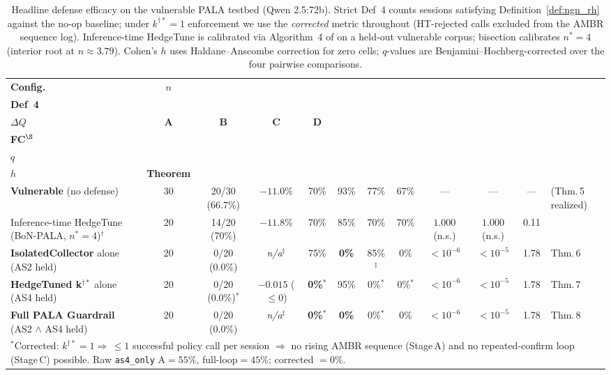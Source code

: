 \begin{table}[!t]
\caption{Headline defense efficacy on the vulnerable PALA testbed
(Qwen 2.5:72b). Strict Def~4 counts sessions satisfying
Definition~\ref{def:ngn_rh} against the no-op baseline; under
$k^{\dagger\!*}\!=\!1$ enforcement we use the \emph{corrected}
metric throughout (HT-rejected calls excluded from the AMBR sequence
log). Inference-time HedgeTune is calibrated via Algorithm~4 of
\cite{ref26} on a held-out vulnerable corpus; bisection calibrates $n^*\!=\!4$
(interior root at $n\approx3.79$). Cohen's $h$ uses
Haldane--Anscombe correction for zero cells; $q$-values are
Benjamini--Hochberg-corrected over the four pairwise comparisons.}
\label{tab:rq4_efficacy}
\centering
\scriptsize
\setlength{\tabcolsep}{3pt}
\renewcommand{\arraystretch}{0.9}
\begin{tabularx}{\textwidth}{p{3.4cm}ccccccccccX}
\toprule
\textbf{Config.} & \textbf{$n$} & \shortstack{\textbf{Strict}\\\textbf{Def~4}} & \shortstack{\textbf{Mean}\\\textbf{$\Delta Q$}} & \textbf{A} & \textbf{B} & \textbf{C} & \textbf{D} & \shortstack{\textbf{$p$ vs}\\\textbf{FC$^\S$}} & \shortstack{\textbf{BH}\\\textbf{$q$}} & \shortstack{\textbf{Cohen}\\\textbf{$h$}} & \textbf{Theorem} \\
\midrule
\textbf{Vulnerable} (no defense) & 30 & 20/30 (66.7\%) & $-11.0\%$ & 70\% & 93\% & 77\% & 67\% & --- & --- & --- & (Thm.\,5 realized) \\
Inference-time HedgeTune (BoN-PALA, $n^{*}\!=\!4$)$^\dagger$ & 20 & 14/20 (70\%) & $-11.8\%$ & 70\% & 85\% & 70\% & 70\% & $1.000$ (n.s.) & $1.000$ (n.s.) & 0.11 & \cite{ref26} \\
\textbf{IsolatedCollector} alone (AS2 held) & 20 & 0/20 (0.0\%) & \emph{n/a}$^\ddagger$ & 75\% & \textbf{0\%} & 85\%$^\ddagger$ & 0\% & $<10^{-6}$ & $<10^{-5}$ & 1.78 & Thm.\,6 \\
\textbf{HedgeTuned k$^{\dagger*}$} alone (AS4 held) & 20 & 0/20 (0.0\%)$^*$ & $-0.015$ ($\le 0$) & \textbf{0\%}$^*$ & 95\% & 0\%$^*$ & 0\%$^*$ & $<10^{-6}$ & $<10^{-5}$ & 1.78 & Thm.\,7 \\
\textbf{Full PALA Guardrail} (AS2 $\wedge$ AS4 held) & 20 & 0/20 (0.0\%) & \emph{n/a}$^\ddagger$ & \textbf{0\%}$^*$ & \textbf{0\%} & 0\%$^*$ & 0\% & $<10^{-6}$ & $<10^{-5}$ & 1.78 & Thm.\,8 \\
\bottomrule
\multicolumn{12}{p{0.97\textwidth}}{\footnotesize $^*$Corrected: $k^{\dagger\!*}\!=\!1\Rightarrow\,\leq\!1$ successful policy call per session $\Rightarrow$ no rising AMBR sequence (Stage\,A) and no repeated-confirm loop (Stage\,C) possible. Raw \texttt{as4\_only} A$=\!55\%$, full-loop$=\!45\%$; corrected $=\!0\%$.}

\end{tabularx}
\end{table}
